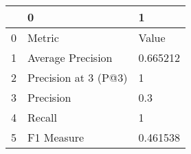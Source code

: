 \begin{tabular}{lll}
\toprule
{} &                     0 &         1 \\
\midrule
0 &                Metric &     Value \\
1 &     Average Precision &  0.665212 \\
2 &  Precision at 3 (P@3) &         1 \\
3 &             Precision &       0.3 \\
4 &                Recall &         1 \\
5 &            F1 Measure &  0.461538 \\
\bottomrule
\end{tabular}
